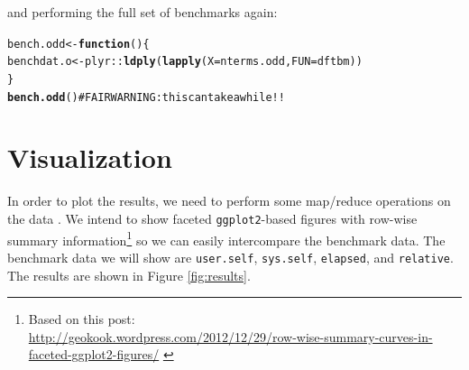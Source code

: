 \documentclass[12pt]{article}\usepackage{graphicx, color}
\makeatletter
\newcommand{\hlfunctioncall}[1]{\textcolor[rgb]{0.501960784313725,0,0.329411764705882}{\textbf{#1}}}%
\newcommand{\hlcomment}[1]{\textcolor[rgb]{0.180392156862745,0.6,0.341176470588235}{#1}}%
\newenvironment{kframe}{%
 \def\at@end@of@kframe{}%
 \ifinner\ifhmode%
  \def\at@end@of@kframe{\end{minipage}}%
  \begin{minipage}{\columnwidth}%
 \fi\fi%
 \def\FrameCommand##1{\hskip\@totalleftmargin \hskip-\fboxsep
 \colorbox{shadecolor}{##1}\hskip-\fboxsep
     \hskip-\linewidth \hskip-\@totalleftmargin \hskip\columnwidth}%
 \MakeFramed {\advance\hsize-\width
   \@totalleftmargin\z@ \linewidth\hsize
   \@setminipage}}%
 {\par\unskip\endMakeFramed%
 \at@end@of@kframe}
\newenvironment{knitrout}{}{} %
\newcommand{\Rcmd}[1]{\texttt{#1}}
\makeatother
\begin{document}
and performing the full set of benchmarks again:
\begin{knitrout}
\color{fgcolor}\begin{kframe}
\begin{alltt}
bench.odd <- \hlfunctioncall{function}() \{
    benchdat.o <- plyr::\hlfunctioncall{ldply}(\hlfunctioncall{lapply}(X = nterms.odd, FUN = dftbm))
\}
\hlfunctioncall{bench.odd}()  \hlcomment{# FAIR WARNING: this can take a while!!}
\end{alltt}
\end{kframe}
\end{knitrout}


\section{Visualization}
In order to plot the results, we need to 
perform some map/reduce operations on the data
\citep{wickham2010}. We intend to show faceted \Rcmd{ggplot2}-based
figures with row-wise summary information\footnote{
Based on this post:\\
{\small
\url{http://geokook.wordpress.com/2012/12/29/row-wise-summary-curves-in-faceted-ggplot2-figures/}
}
} so we can easily intercompare the benchmark data.
The benchmark data we will show
are \Rcmd{user.self}, \Rcmd{sys.self}, \Rcmd{elapsed}, and \Rcmd{relative}.
The results are shown
in Figure \ref{fig:results}.
\end{document}
